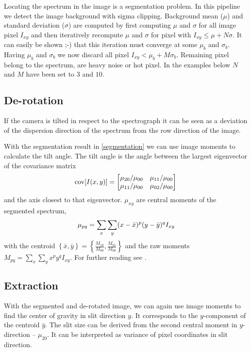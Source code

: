 \documentclass[10pt,a4paper,notitlepage]{article}
\begin{document}
		Locating the spectrum in the image is a segmentation problem.
		In this pipeline we detect the image background with sigma clipping.
		Background mean ($\mu$) and standard deviation ($\sigma$) are computed by first computing $\mu$ and $\sigma$ for all image pixel $I_{xy}$ and then iteratively recompute $\mu$ and $\sigma$ for pixel with $I_{xy} \le \mu + N \sigma$.
		It can easily be shown ;-) that this iteration must converge at some $\mu_b$ and $\sigma_b$.
		Having $\mu_b$ and $\sigma_b$ we now discard all pixel $I_{xy} < \mu_b + M \sigma_b$.
		Remaining pixel belong to the spectrum, are heavy noise or hot pixel.
		In the examples below $N$ and $M$ have been set to $3$ and $10$.

	\subsection{De-rotation}
		\label{derotation}
	
		If the camera is tilted in respect to the spectrograph it can be seen as a deviation of the dispersion direction of the spectrum from the row direction of the image.
		 
		With the segmentation result in \ref{segmentation} we can use image moments to calculate the tilt angle.
		The tilt angle is the angle between the largest eigenvector of the covariance matrix
		$$
			\operatorname{cov}[I(x,y)] = \begin{bmatrix} \mu_{20} / \mu_{00} & \mu_{11} / \mu_{00} \\ \mu_{11} / \mu_{00} & \mu_{02} / \mu_{00} \end{bmatrix} \\
		$$
		and the axis closest to that eigenvector.
		$\mu_{xy}$ are central moments of the segmented spectrum,
		$$
			\mu_{pq}  = \sum_{x} \sum_{y} (x - \bar{x})^p(y - \bar{y})^q I_{xy} \\
		$$
		with the centroid $\left\{\bar{x}, \bar{y}\right\} = \left\{\frac{M_{10}}{M_{00}}, \frac{M_{01}}{M_{00}}\right\}$
		and the raw moments $M_{pq} = \sum_x \sum_y x^p y^q I_{xy}$.
		For further reading see \cite{ImageMoments}.
	
	\subsection{Extraction}
		\label{extraction}
	
		With the segmented and de-rotated image, we can again use image moments to find the center of gravity in slit direction $y$. It corresponds to the $y$-component of the centroid $\bar{y}$.
		The slit size can be derived from the second central moment in $y$-direction -- $\mu_{20}$.
		It can be interpreted as variance of pixel coordinates in slit direction.
		
\end{document}
